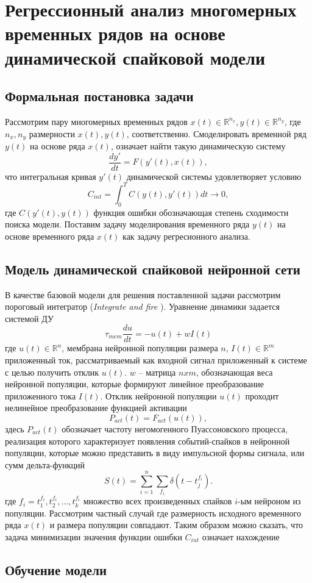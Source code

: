 \chapter{Регрессионный анализ многомерных временных рядов на основе динамической спайковой модели} \label{chapt2}

\section{Формальная постановка задачи} \label{sect2_1}
\indent Рассмотрим пару многомерных временных рядов $x(t) \in \mathbb{R}^{n_{x}}, y(t) \in \mathbb{R}^{n_{y}}$, где $n_{x}, n_{y}$ размерности $x(t), y(t)$, соответственно. Смоделировать временной ряд $y(t)$ на основе ряда $x(t)$, означает найти  такую динамическую систему 
\begin{equation}
\frac{dy'}{dt} = F(y'(t), x(t)),
\end{equation}
что интегральная кривая $y'(t)$ динамической системы удовлетворяет условию
\begin{equation}
C_{int} = \int_{0}^{T} C(y(t), y'(t)) dt \rightarrow 0,
\end{equation}
где $C(y'(t), y(t))$ функция ошибки обозначающая степень сходимости поиска модели. Поставим задачу моделирования временного ряда $y(t)$ на основе временного ряда $x(t)$ как задачу регресионного анализа.


\section{Модель динамической спайковой нейронной сети} \label{sect2_2}
\indent В качестве базовой модели для решения поставленной задачи рассмотрим пороговый интегратор (\textit{Integrate and fire} \cite{burkitt2006review}). Уравнение динамики задается системой ДУ
\begin{equation}
\tau_{mem} \frac{du}{dt} = -u(t) + w I(t)
\end{equation}
где $u(t) \in \mathbb{R}^{n}$, мембрана нейронной популяции размера $n$, $I(t) \in \mathbb{R}^{m}$ приложенный ток, рассматриваемый как входной сигнал приложенный к системе с целью получить отклик $u(t)$. $w$ -- матрица $n x m$, обозначающая веса нейронной популяции, которые формируют линейное преобразование приложенного тока $I(t)$. Отклик нейронной популяции $u(t)$ проходит нелинейное преобразование функцией активации
\begin{equation}
P_{act}(t) = F_{act}(u(t)),
\end{equation}
здесь $P_{act}(t)$ обозначает частоту негомогенного Пуассоновского процесса, реализация которого характеризует появления событий-спайков в нейронной популяции, которые можно представить в виду импульсной формы сигнала, или сумм дельта-функций
\begin{equation}
S(t) = \sum_{i=1}^n \sum_{f_{i}} \delta(t - t_{j}^{f_{i}}).
\end{equation}
где $f_{i} = {t_{1}^{f_{i}}, t_{2}^{f_{i}}, ..., t_{k}^{f_{i}}}$ множество всех произведенных спайков $i$-ым нейроном из популяции.
Рассмотрим частный случай где размерность исходного временного ряда $x(t)$ и размера популяции совпадают. Таким образом можно сказать, что задача минимизации значения функции ошибки $C_{int}$ означает нахождение 


\section{Обучение модели} \label{sect2_3}
